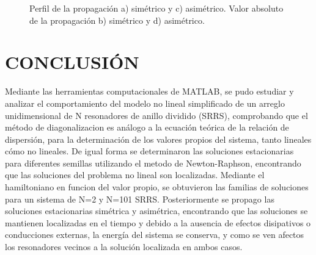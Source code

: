 \documentclass[11pt,letterpaper,twocolumn]{article}
\begin{document}
\begin{figure}[h!]
\caption{Perfil de la propagación a) simétrico y c) asimétrico. Valor absoluto de la propagación b) simétrico y d) asimétrico.}
\end{figure}
\section*{\normalsize{CONCLUSIÓN}}
Mediante las herramientas computacionales de MATLAB, se pudo estudiar y analizar el comportamiento del modelo no lineal simplificado de un arreglo unidimensional de N resonadores de anillo dividido (SRR\textquotesingle S), comprobando que el método de diagonalizacion es análogo a la ecuación teórica de la relación de dispersión, para la determinación de los valores propios del sistema, tanto lineales cómo no lineales. De igual forma se determinaron las soluciones estacionarias para diferentes semillas utilizando el metodo de Newton-Raphson, encontrando que las soluciones del problema no lineal son localizadas. Mediante el hamiltoniano en funcion del valor propio, se obtuvieron las familias de soluciones para un sistema de N=2 y N=101 SRR\textquotesingle S. Posteriormente se propago las soluciones estacionarias simétrica y asimétrica, encontrando que las soluciones se mantienen localizadas en el tiempo y debido a la ausencia de efectos disipativos o conducciones externas, la energía del sistema se conserva, y como se ven afectos los resonadores vecinos a la solución localizada en ambos casos. 
\end{document}
